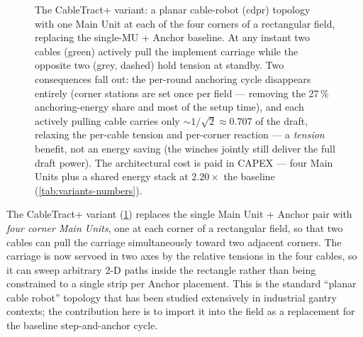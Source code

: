 \documentclass[11pt,a4paper]{article}
\begin{document}
\begin{figure}[H]
{%
}
\caption{The CableTract+ variant: a planar cable-robot (\gls{cdpr}) topology~\cite{pott2018cdpr} with one Main Unit at each of the four corners of a rectangular field, replacing the single-MU + Anchor baseline. At any instant two cables (\textcolor{green!50!black}{green}) actively pull the implement carriage while the opposite two (\textcolor{gray!40!black}{grey}, dashed) hold tension at standby. Two consequences fall out: the per-round anchoring cycle disappears entirely (corner stations are set once per field --- removing the 27\,\% anchoring-energy share and most of the setup time), and each actively pulling cable carries only ${\sim}1/\sqrt{2}\approx 0.707$ of the draft, relaxing the per-cable tension and per-corner reaction --- a \emph{tension} benefit, not an energy saving (the winches jointly still deliver the full draft power). The architectural cost is paid in CAPEX --- four Main Units plus a shared energy stack at $2.20\times$ the baseline (\cref{tab:variants-numbers}).}
\label{fig:f0e}
\end{figure}

The CableTract+ variant (\cref{fig:f0e}) replaces the single Main Unit + Anchor pair with \emph{four corner Main Units}, one at each corner of a rectangular field, so that two cables can pull the carriage simultaneously toward two adjacent corners. The carriage is now servoed in two axes by the relative tensions in the four cables, so it can sweep arbitrary 2-D paths inside the rectangle rather than being constrained to a single strip per Anchor placement. This is the standard ``planar cable robot'' topology that has been studied extensively in industrial gantry contexts; the contribution here is to import it into the field as a replacement for the baseline step-and-anchor cycle.
\end{document}
